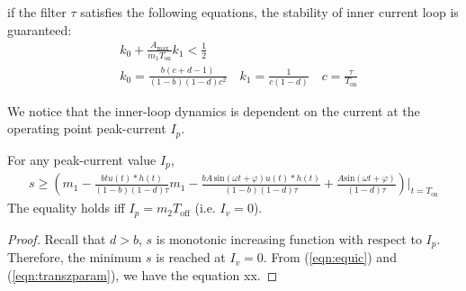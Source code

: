 \begin{theorem}
if the filter $\tau$ satisfies the following equations, the stability of inner current loop is guaranteed:
\begin{align}
    & k_0 + \frac{A_{\text{max}}}{m_1 T_{\text{on}}} k_1 < \frac{1}{2} \nonumber \\
    & k_0 = \frac{b(c+d-1)}{(1-b)(1-d)c^2} \quad k_1 = \frac{1}{c(1-d)} \quad c = \frac{\tau}{T_{\text{on}}}
\end{align}
\end{theorem}
We notice that the inner-loop dynamics is dependent on the current at the operating point peak-current $I_p$.
\begin{proposition}
For any peak-current value $I_p$,
\begin{align} \label{eqn:s_lower_bound1}
    s  %
    \ge  \left( m_1 - \frac{b tu(t)*h(t)}{(1-b)(1-d)\tau} m_1-\frac{b A\, \text{sin}(\omega t+\varphi) u(t)*h(t)}{(1-b)(1-d)\tau} + \frac{A\text{sin}(\omega t+\varphi)}{(1-d)\tau} \right) \bigg\vert_{t = T_{\text{on}}}
\end{align}
The equality holds iff  $I_p = m_2 T_{\text{off}}$ (i.e. $I_v = 0$).\\
\end{proposition}

\begin{proof}
 Recall that $d > b$, $s$ is monotonic increasing function with respect to $I_p$. Therefore, the minimum $s$ is reached at $I_v = 0$. From (\ref{eqn:equic}) and (\ref{eqn:transzparam}), we have the equation xx.
\end{proof}

\begin{proposition}

\end{proposition}


